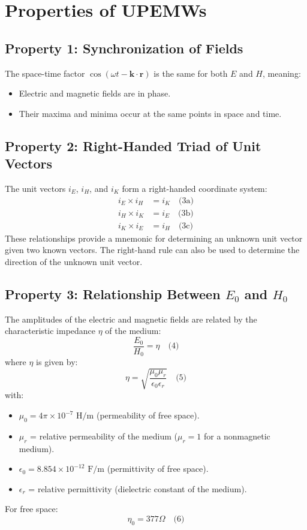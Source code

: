 \documentclass{article}
\begin{document}
\section{Properties of UPEMWs}
\subsection{Property 1: Synchronization of Fields}
The space-time factor $\cos(\omega t - \mathbf{k} \cdot \mathbf{r})$ is the same for both $E$ and $H$, meaning:
\begin{itemize}
    \item Electric and magnetic fields are in phase.
    \item Their maxima and minima occur at the same points in space and time.
\end{itemize}

\subsection{Property 2: Right-Handed Triad of Unit Vectors}
The unit vectors $i_E$, $i_H$, and $i_K$ form a right-handed coordinate system:
\begin{align}
    i_E \times i_H &= i_K \quad \text{(3a)} \\
    i_H \times i_K &= i_E \quad \text{(3b)} \\
    i_K \times i_E &= i_H \quad \text{(3c)}
\end{align}
These relationships provide a mnemonic for determining an unknown unit vector given two known vectors. The right-hand rule can also be used to determine the direction of the unknown unit vector.

\subsection{Property 3: Relationship Between $E_0$ and $H_0$}
The amplitudes of the electric and magnetic fields are related by the characteristic impedance $\eta$ of the medium:
\begin{equation}
    \frac{E_0}{H_0} = \eta \quad \text{(4)}
\end{equation}
where $\eta$ is given by:
\begin{equation}
    \eta = \sqrt{\frac{\mu_0 \mu_r}{\epsilon_0 \epsilon_r}} \quad \text{(5)}
\end{equation}
with:
\begin{itemize}
    \item $\mu_0 = 4\pi \times 10^{-7} \text{ H/m}$ (permeability of free space).
    \item $\mu_r$ = relative permeability of the medium ($\mu_r = 1$ for a nonmagnetic medium).
    \item $\epsilon_0 = 8.854 \times 10^{-12} \text{ F/m}$ (permittivity of free space).
    \item $\epsilon_r$ = relative permittivity (dielectric constant of the medium).
\end{itemize}
For free space:
\begin{equation}
    \eta_0 = 377 \Omega \quad \text{(6)}
\end{equation}
\end{document}
